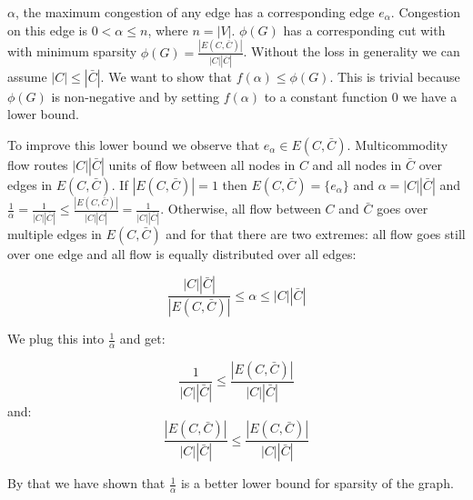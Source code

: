 \documentclass[a4paper,11pt,oneside,onecolumn]{article}
\begin{document}
$\alpha$, the maximum congestion of any edge has a corresponding edge $e_\alpha$. Congestion on this edge is $0 < \alpha \le n$, where $n = |V|$. $\phi(G)$ has
a corresponding cut with with minimum sparsity $\phi(G) = \frac{|E(C,\bar C)|}{|C||\bar C|}$. Without the loss in generality we can assume $|C| \le |\bar C|$. We want to show that $f(\alpha) \le \phi(G)$. This is trivial because $\phi(G)$ is non-negative and by setting $f(\alpha)$ to a constant function $0$ we have a lower bound.

To improve this lower bound we observe that $e_\alpha \in E(C,\bar C)$. Multicommodity flow routes $|C||\bar C|$ units of flow between all nodes in $C$ and all nodes in $\bar C$ over edges in $E(C,\bar C)$. If $|E(C,\bar C)| = 1$ then $E(C,\bar C) = \{e_\alpha\} $ and $\alpha = |C||\bar C|$ and $\frac{1}{\alpha} = \frac{1}{|C||\bar C|} \le \frac{|E(C,\bar C)|}{|C||\bar C|} = \frac{1}{|C||\bar C|}$. Otherwise, all flow between $C$ and $\bar C$ goes over multiple edges in $E(C,\bar C)$ and for that there are two extremes: all flow goes still over one edge and all flow is equally distributed over all edges:

$$
\frac{|C||\bar C|}{|E(C,\bar C)|} \le \alpha \le |C||\bar C|
$$

We plug this into $\frac{1}{\alpha}$ and get:

$$
\frac{1}{|C||\bar C|} \le \frac{|E(C,\bar C)|}{|C||\bar C|}
$$
and:
$$
\frac{|E(C,\bar C)|}{|C||\bar C|} \le \frac{|E(C,\bar C)|}{|C||\bar C|}
$$

By that we have shown that $\frac{1}{\alpha}$ is a better lower bound
for sparsity of the graph.
\end{document}
